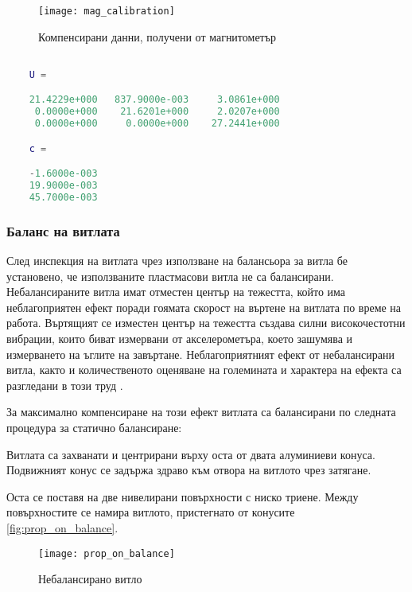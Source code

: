 \begin{figure}[htpb!]
    \centering
    \texttt{[image: mag\_calibration]}
    \caption{Компенсирани данни, получени от магнитометър}
    \label{fig:mag_calibration}
\end{figure}

\begin{lstlisting}[language=matlab, caption={Получени трансформация елипсоид-сфера и отместване на център}, label={lst:mag_cal_trans}]

    U =

    21.4229e+000   837.9000e-003     3.0861e+000
     0.0000e+000    21.6201e+000     2.0207e+000
     0.0000e+000     0.0000e+000    27.2441e+000

    c =

    -1.6000e-003
    19.9000e-003
    45.7000e-003

\end{lstlisting}

\subsubsection{Баланс на витлата}

След инспекция на витлата чрез използване на балансьора за витла бе установено, че използваните пластмасови витла не са балансирани.
Небалансираните витла имат отместен център на тежестта, който има неблагоприятен ефект поради гоямата скорост на въртене на витлата по време на работа.
Въртящият се изместен център на тежестта създава силни високочестотни вибрации, които биват измервани от акселерометъра, което зашумява и измерването на ъглите на завъртане.
Неблагоприятният ефект от небалансирани витла, както и количественото оценяване на големината и характера на ефекта са разгледани в този труд \cite{prop_balance}.

За максимално компенсиране на този ефект витлата са балансирани по следната процедура за статично балансиране\cite{balance_proppelers_horizon}:

Витлата са захванати и центрирани върху оста от двата алуминиеви конуса. 
Подвижният конус се задържа здраво към отвора на витлото чрез затягане.

Оста се поставя на две нивелирани повърхности с ниско триене.
Между повърхностите се намира витлото, пристегнато от конусите \autoref{fig:prop_on_balance}.

\begin{figure}[htpb!]
    \centering
    \texttt{[image: prop\_on\_balance]}
    \caption{Небалансирано витло}
    \label{fig:prop_on_balance}
\end{figure}

